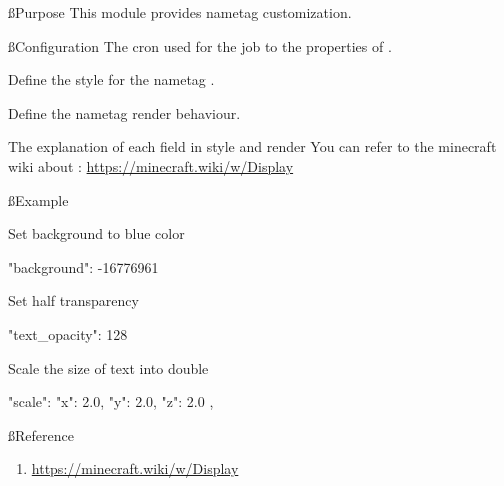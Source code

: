 \ss{Purpose}
This module provides nametag customization.

\ss{Configuration}
The cron used for the job to  the properties of .

Define the style for the nametag .

Define the nametag render behaviour.

\begin{note}{The explanation of each field in style and render}
    You can refer to the minecraft wiki about : \url{https://minecraft.wiki/w/Display}
\end{note}

\ss{Example}
\begin{example}{Set background to blue color}
    \begin{json}
        "background": -16776961
    \end{json}
\end{example}

\begin{example}{Set half transparency}
    \begin{json}
        "text_opacity": 128
    \end{json}
\end{example}

\begin{example}{Scale the size of text into double}
    \begin{json}
        "scale": {
            "x": 2.0,
            "y": 2.0,
            "z": 2.0
        },
    \end{json}

\end{example}

\ss{Reference}
\begin{enumerate}
    \item \url{https://minecraft.wiki/w/Display}
\end{enumerate}